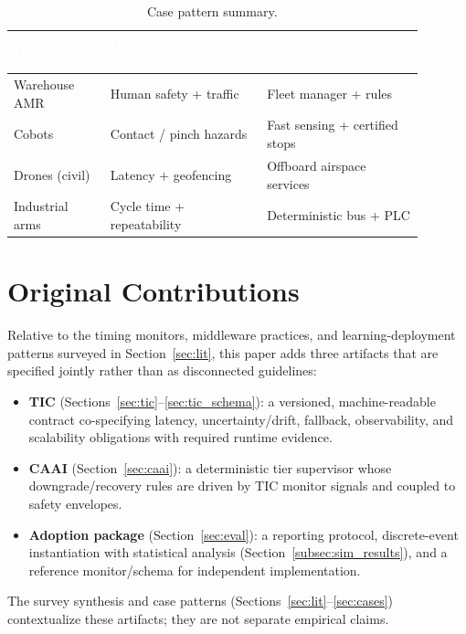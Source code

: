 \documentclass[smallextended]{svjour3}
\begin{document}
\begin{table}[htbp]
  \centering
  \caption{Case pattern summary.}
  \label{tab:cases}
  \renewcommand{\arraystretch}{1.15}
  \begin{tabular}{@{}L{0.21\linewidth}L{0.34\linewidth}L{0.34\linewidth}@{}}
    \toprule
    \textcolor{white}{\textbf{Domain}} &
    \textcolor{white}{\textbf{Dominant real-time concern}} &
    \textcolor{white}{\textbf{Scalability lever}} \\
    \midrule
    Warehouse AMR    & Human safety + traffic       & Fleet manager + rules \\
    Cobots           & Contact / pinch hazards      & Fast sensing + certified stops \\
    Drones (civil)   & Latency + geofencing         & Offboard airspace services \\
    Industrial arms  & Cycle time + repeatability   & Deterministic bus + PLC \\
    \bottomrule
  \end{tabular}
  \renewcommand{\arraystretch}{1}
\end{table}

\section{Original Contributions}
\label{sec:contributions}

Relative to the timing monitors, middleware practices, and learning-deployment patterns surveyed in Section~\ref{sec:lit}, this paper adds three artifacts that are specified jointly rather than as disconnected guidelines:
\begin{itemize}[leftmargin=*,itemsep=0.2em]
  \item \textbf{TIC} (Sections~\ref{sec:tic}--\ref{sec:tic_schema}): a versioned, machine-readable contract co-specifying latency, uncertainty/drift, fallback, observability, and scalability obligations with required runtime evidence.
  \item \textbf{CAAI} (Section~\ref{sec:caai}): a deterministic tier supervisor whose downgrade/recovery rules are driven by TIC monitor signals and coupled to safety envelopes.
  \item \textbf{Adoption package} (Section~\ref{sec:eval}): a reporting protocol, discrete-event instantiation with statistical analysis (Section~\ref{subsec:sim_results}), and a reference monitor/schema for independent implementation.
\end{itemize}
The survey synthesis and case patterns (Sections~\ref{sec:lit}--\ref{sec:cases}) contextualize these artifacts; they are not separate empirical claims.
\end{document}
